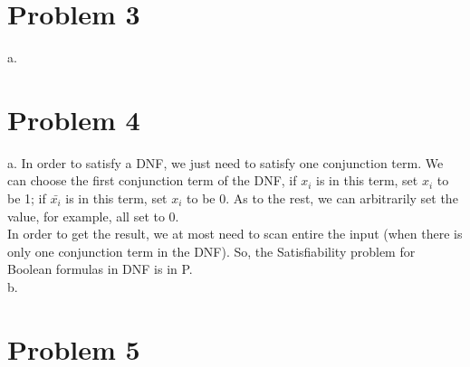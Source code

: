 \documentclass[12pt]{article}
\begin{document}
\section*{Problem 3}

a.


\section*{Problem 4}

a. In order to satisfy a DNF, we just need to satisfy one conjunction term. We can choose the first conjunction term of the DNF, if $x_i$ is in this term, set $x_i$ to be 1; if $\bar {x_i}$ is in this term, set $x_i$ to be 0. As to the rest, we can arbitrarily set the value, for example, all set to 0. \\

In order to get the result, we at most need to scan entire the input (when there is only one conjunction term in the DNF). So, the Satisfiability problem for Boolean formulas in DNF is in P. \\

b. \\

\section*{Problem 5}
\end{document}
